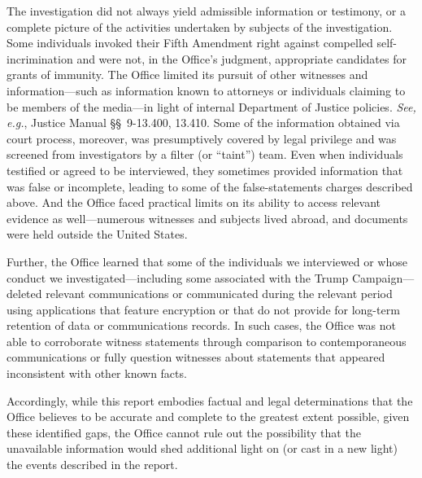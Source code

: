 The investigation did not always yield admissible information or testimony, or a complete picture of the activities undertaken by subjects of the investigation.
Some individuals invoked their Fifth Amendment right against compelled self-incrimination and were not, in the Office's judgment, appropriate candidates for grants of immunity.
The Office limited its pursuit of other witnesses and information---such as information known to attorneys or individuals claiming to be members of the media---in light of internal Department of Justice policies.
\textit{See, e.g.}, Justice Manual \S\S~9-13.400, 13.410. Some of the information obtained via court process, moreover, was presumptively covered by legal privilege and was screened from investigators by a filter (or ``taint'') team.
Even when individuals testified or agreed to be interviewed, they sometimes provided information that was false or incomplete, leading to some of the false-statements charges described above.
And the Office faced practical limits on its ability to access relevant evidence as well---numerous witnesses and subjects lived abroad, and documents were held outside the United States.

Further, the Office learned that some of the individuals we interviewed or whose conduct we investigated---including some associated with the Trump Campaign---deleted relevant communications or communicated during the relevant period using applications that feature encryption or that do not provide for long-term retention of data or communications records.
In such cases, the Office was not able to corroborate witness statements through comparison to contemporaneous communications or fully question witnesses about statements that appeared inconsistent with other known facts.

Accordingly, while this report embodies factual and legal determinations that the Office believes to be accurate and complete to the greatest extent possible, given these identified gaps, the Office cannot rule out the possibility that the unavailable information would shed additional light on (or cast in a new light) the events described in the report.


